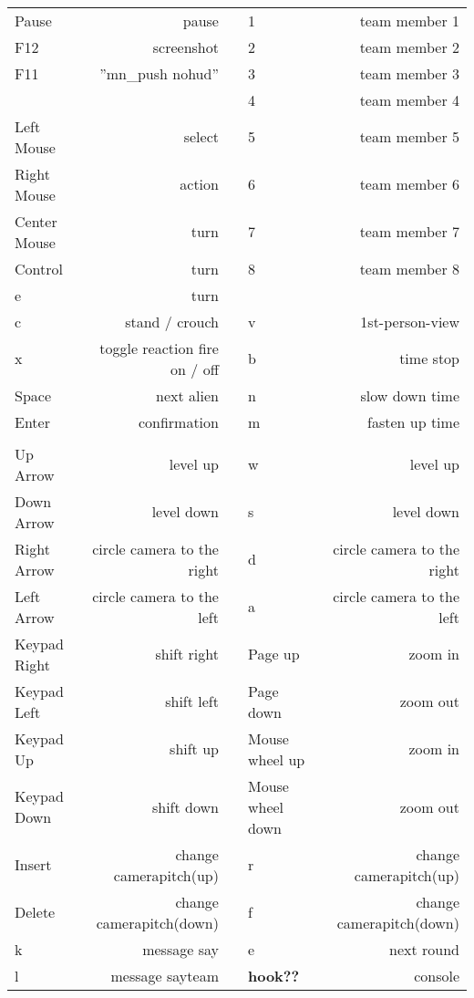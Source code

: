 \paragraph*{}
\begin{tabular}{|lrclr|}
\hline 
Pause 							 & pause  					 			&  & 1 & team member 1	\\ 
F12 								 & screenshot  						&  & 2 & team member 2	\\ 
F11 								 & ''mn\_push nohud'' 				&  & 3 & team member 3	\\ 
 									 & 								 			&  & 4 & team member 4	\\  
Left Mouse				 	 & select									&  & 5 & team member 5	\\ 
Right Mouse  				 & action						 			&  & 6 & team member 6	\\ 
Center Mouse 			  	 & turn								 		&  & 7 & team member 7	\\ 
Control 						 & turn 									&  & 8 & team member 8 	\\ 
e									 &	 turn										&  & 	&								\\ 
c									 &  stand / crouch		 			&  & v	&	1st-person-view 	\\ 
x 									 & toggle reaction fire on / off &  & b	& time stop				\\ 
Space 							 & next alien 							&  & n 	& slow down time 	\\ 
Enter 							 & confirmation 						&  & m & fasten up time 	\\ 
 									 &  											&  &  	&  							\\ 
Up Arrow 						 & level up 								&  & w 	& level up 				\\ 
Down Arrow 					 & level down  							&  & s 	& level down 			\\ 
Right Arrow 					 & circle camera to the right 	&  & d 	& circle camera to the right 				\\ 
Left Arrow 					 & circle camera to the left 		&  & a  & circle camera to the left 					\\ 
Keypad Right 				 & shift right 							&  & Page up 					& zoom in  				\\ 
Keypad Left 					 & shift left  								&  & Page down 				& zoom out 			\\ 
Keypad Up 					 & shift up 								&  & Mouse wheel up 		& zoom in 				\\ 
Keypad Down 				 & shift down 							&  & Mouse wheel down & zoom out  			\\ 
Insert 							 & change camerapitch(up)	&  & r 								& change camerapitch(up)		\\
Delete 							 & change camerapitch(down) &  & f 								& change camerapitch(down)	\\
k  									 & message say 						&  & e 								& next round			\\
l 									 & message sayteam 				&  & \textbf{ hook??}		& 	console 				\\
\hline
\end{tabular} 

